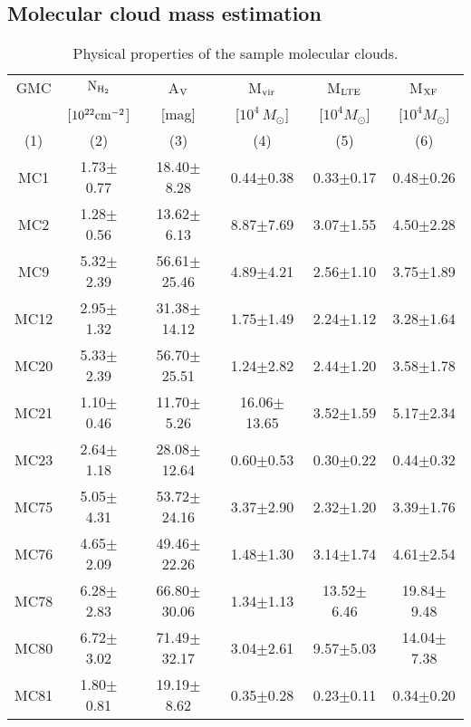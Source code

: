 \documentclass[iop]{emulateapj}
\begin{document}
\subsection{Molecular cloud mass estimation}

\begin{table*}[!h!t]
\begin{center}
\centering 
\caption{Physical properties of the sample molecular clouds.}
\begin{tabular}{cccccc}
\hline
\hline
GMC   & ${\rm N_{H_2}}$ & A$_{\rm V}$ &M${\rm_{vir}}$ &  M${\rm _{LTE}}$ & M${\rm_{XF}}$ \\%
      & [$\rm 10^{22}cm^{-2}$]  & [mag]  &[$10^4\,M_{\odot}$]  & [$10^4M_{\odot}$] &[$10^4M_{\odot}$]  \\%
 (1) & (2) & (3) & (4) & (5) & (6) \\%
\hline
 MC1  & 1.73$\pm$0.77  & 18.40$\pm$8.28 & 0.44$\pm$0.38 &  0.33$\pm$0.17 & 0.48$\pm$0.26  \\
 MC2  & 1.28$\pm$0.56  & 13.62$\pm$6.13 & 8.87$\pm$7.69 &  3.07$\pm$1.55 & 4.50$\pm$2.28  \\
 MC9  & 5.32$\pm$2.39  & 56.61$\pm$25.46 & 4.89$\pm$4.21 &  2.56$\pm$1.10 & 3.75$\pm$1.89  \\
 MC12 & 2.95$\pm$1.32  & 31.38$\pm$14.12 & 1.75$\pm$1.49 &  2.24$\pm$1.12 & 3.28$\pm$1.64  \\
 MC20 & 5.33$\pm$2.39  & 56.70$\pm$25.51 & 1.24$\pm$2.82 &  2.44$\pm$1.20 & 3.58$\pm$1.78  \\
 MC21 & 1.10$\pm$0.46  & 11.70$\pm$5.26 & 16.06$\pm$13.65 & 3.52$\pm$1.59 & 5.17$\pm$2.34  \\
 MC23 & 2.64$\pm$1.18  & 28.08$\pm$12.64 & 0.60$\pm$0.53 &  0.30$\pm$0.22 & 0.44$\pm$0.32  \\
 MC75 & 5.05$\pm$4.31  & 53.72$\pm$24.16 & 3.37$\pm$2.90 &  2.32$\pm$1.20 & 3.39$\pm$1.76  \\
 MC76 & 4.65$\pm$2.09  & 49.46$\pm$22.26 & 1.48$\pm$1.30 &  3.14$\pm$1.74 & 4.61$\pm$2.54   \\
 MC78 & 6.28$\pm$2.83  & 66.80$\pm$30.06 & 1.34$\pm$1.13 & 13.52$\pm$6.46 &19.84$\pm$9.48  \\
 MC80 & 6.72$\pm$3.02  & 71.49$\pm$32.17 & 3.04$\pm$2.61 &  9.57$\pm$5.03 & 14.04$\pm$7.38  \\
 MC81 & 1.80$\pm$0.81  & 19.19$\pm$8.62 & 0.35$\pm$0.28 &  0.23$\pm$0.11 & 0.34$\pm$0.20  \\
\hline
\end{tabular}
\end{center}
\end{table*}
\end{document}
